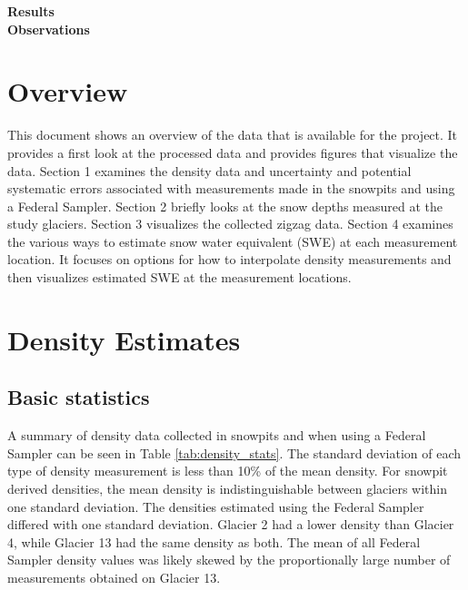 \documentclass[12pt]{article}
\begin{document}

\begin{center}
\Large \textbf{Results\\ Observations}
\end{center}


\section*{Overview}

This document shows an overview of the data that is available for the project. It provides a first look at the processed data and provides figures that visualize the data. Section 1 examines the density data and uncertainty and potential systematic errors associated with measurements made in the snowpits and using a Federal Sampler. Section 2 briefly looks at the snow depths measured at the study glaciers. Section 3 visualizes the collected zigzag data. Section 4 examines the various ways to estimate snow water equivalent (SWE) at each measurement location. It focuses on options for how to interpolate density measurements and then visualizes estimated SWE at the measurement locations. 


\tableofcontents
\pagebreak



\section{Density Estimates}

\subsection{Basic statistics}

A summary of density data collected in snowpits and when using a Federal Sampler can be seen in Table \ref{tab:density_stats}. The standard deviation of each type of density measurement is less than 10\% of the mean density. For snowpit derived densities, the mean density is indistinguishable between glaciers within one standard deviation. The densities estimated using the Federal Sampler differed with one standard deviation. Glacier 2 had a lower density than Glacier 4, while Glacier 13 had the same density as both. The mean of all Federal Sampler density values was likely skewed by the proportionally large number of measurements obtained on Glacier 13.
\end{document}
